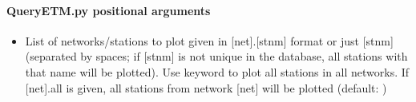 \documentclass[letterpaper,10pt,english]{sphinxmanual}
\begin{document}
\begin{sphinxVerbatim}[commandchars=\\\{\}]
 \PYG{p}{[}\PYG{p}{]} \PYG{p}{[}    \PYG{p}{]} \PYG{p}{[} \PYG{p}{]} \PYG{p}{[} \PYG{p}{]}
            \PYG{p}{[}  \PYG{p}{[} \PYG{p}{]}\PYG{p}{]} \PYG{p}{[}\PYG{p}{]} \PYG{p}{[}\PYG{p}{]} \PYG{p}{[}\PYG{p}{]}
             \PYG{p}{[} \PYG{p}{]}
\end{sphinxVerbatim}


\paragraph{QueryETM.py positional arguments}
\label{\detokenize{com:QueryETM.py-positional-arguments}}\begin{itemize}
\item {} 
\sphinxAtStartPar
{\hyperref[\detokenize{com:QueryETM.py-stnlist}]{}} \sphinxhyphen{} List of networks/stations to plot given in {[}net{]}.{[}stnm{]} format or just {[}stnm{]} (separated by spaces; if {[}stnm{]} is not unique in the database, all stations with that name will be plotted). Use keyword  to plot all stations in all networks. If {[}net{]}.all is given, all stations from network {[}net{]} will be plotted (default: )

\end{itemize}
\end{document}
